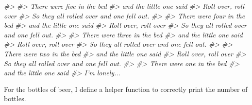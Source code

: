 \documentclass[]{book}
\newenvironment{Shaded}{\begin{snugshade}}{\end{snugshade}}
\newcommand{\CommentTok}[1]{\textcolor[rgb]{0.56,0.35,0.01}{\textit{#1}}}
\theoremstyle{definition}
\theoremstyle{definition}
\theoremstyle{definition}
\theoremstyle{remark}
\begin{document}
\begin{Shaded}
\begin{Highlighting}[]
\CommentTok{#> }
\CommentTok{#> There were five in the bed}
\CommentTok{#> and the little one said}
\CommentTok{#> Roll over, roll over}
\CommentTok{#> So they all rolled over and one fell out.}
\CommentTok{#> }
\CommentTok{#> There were four in the bed}
\CommentTok{#> and the little one said}
\CommentTok{#> Roll over, roll over}
\CommentTok{#> So they all rolled over and one fell out.}
\CommentTok{#> }
\CommentTok{#> There were three in the bed}
\CommentTok{#> and the little one said}
\CommentTok{#> Roll over, roll over}
\CommentTok{#> So they all rolled over and one fell out.}
\CommentTok{#> }
\CommentTok{#> There were two in the bed}
\CommentTok{#> and the little one said}
\CommentTok{#> Roll over, roll over}
\CommentTok{#> So they all rolled over and one fell out.}
\CommentTok{#> }
\CommentTok{#> There were one in the bed}
\CommentTok{#> and the little one said}
\CommentTok{#> I'm lonely...}
\end{Highlighting}
\end{Shaded}

For the bottles of beer, I define a helper function to correctly print
the number of bottles.
\end{document}
